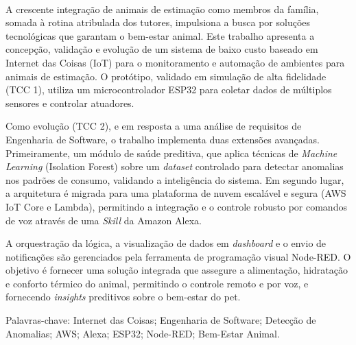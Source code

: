 \ \ \\[2cm]
A crescente integração de animais de estimação como membros da família, somada à rotina atribulada dos tutores, impulsiona a busca por soluções tecnológicas que garantam o bem-estar animal. Este trabalho apresenta a concepção, validação e evolução de um sistema de baixo custo baseado em Internet das Coisas (IoT) para o monitoramento e automação de ambientes para animais de estimação. O protótipo, validado em simulação de alta fidelidade (TCC 1), utiliza um microcontrolador ESP32 para coletar dados de múltiplos sensores e controlar atuadores.

Como evolução (TCC 2), e em resposta a uma análise de requisitos de Engenharia de Software, o trabalho implementa duas extensões avançadas. Primeiramente, um módulo de saúde preditiva, que aplica técnicas de \textit{Machine Learning} (Isolation Forest) sobre um \textit{dataset} controlado para detectar anomalias nos padrões de consumo, validando a inteligência do sistema. Em segundo lugar, a arquitetura é migrada para uma plataforma de nuvem escalável e segura (AWS IoT Core e Lambda), permitindo a integração e o controle robusto por comandos de voz através de uma \textit{Skill} da Amazon Alexa.

A orquestração da lógica, a visualização de dados em \textit{dashboard} e o envio de notificações são gerenciados pela ferramenta de programação visual Node-RED. O objetivo é fornecer uma solução integrada que assegure a alimentação, hidratação e conforto térmico do animal, permitindo o controle remoto e por voz, e fornecendo \textit{insights} preditivos sobre o bem-estar do pet.

\vspace{1cm}
Palavras-chave: Internet das Coisas; Engenharia de Software; Detecção de Anomalias; AWS; Alexa; ESP32; Node-RED; Bem-Estar Animal.